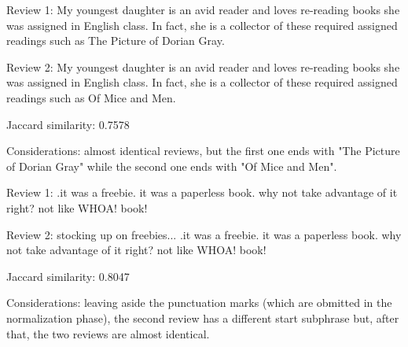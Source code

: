 \documentclass[12pt, a4paper[]{article}
\begin{document}
\dotfill
\begin{itemize}
    {\fontsize{9pt}{11pt}\selectfont
    \item Review 1: My youngest daughter is an avid reader and loves re-reading books she was assigned in English class. In fact, she is a collector of these required assigned readings such as The Picture of Dorian Gray.
    \item Review 2: My youngest daughter is an avid reader and loves re-reading books she was assigned in English class. In fact, she is a collector of these required assigned readings such as Of Mice and Men.
    \item Jaccard similarity: 0.7578
    \item Considerations: almost identical reviews, but the first one ends with "The Picture of Dorian Gray" while the second one ends with "Of Mice and Men".
    }
\end{itemize}
\dotfill
\begin{itemize}
    {\fontsize{9pt}{11pt}\selectfont
    \item Review 1: .it was a freebie. it was a paperless book. why not take advantage of it right? not like WHOA! book!
    \item Review 2: stocking up on freebies... .it was a freebie. it was a paperless book. why not take advantage of it right? not like WHOA! book!
    \item Jaccard similarity: 0.8047
    \item Considerations: leaving aside the punctuation marks (which are obmitted in the normalization phase), the second review has a different start subphrase but, after that, the two reviews are almost identical.
    }
\end{itemize}
\dotfill
\end{document}
